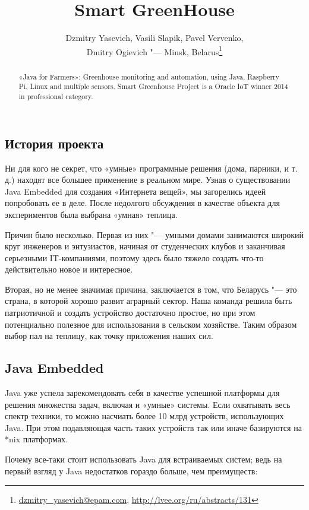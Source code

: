 \documentclass[10pt, a5paper]{article}
\begin{document}
\title{Smart GreenHouse}
\author{Dzmitry Yasevich, Vasili Slapik, Pavel Vervenko, \\
Dmitry Ogievich "--- Minsk, Belarus\footnote{\url{dzmitry_yasevich@epam.com}, \url{http://lvee.org/ru/abstracts/131}}}
\maketitle
\begin{abstract}
«Java for Farmers»: Greenhouse monitoring and automation, using Java, Raspberry Pi, Linux and multiple sensors. Smart Greenhouse Project is a Oracle IoT winner 2014 in professional category.
\end{abstract}
\subsection*{История проекта}

Ни для кого не секрет, что «умные» программные решения (дома, парники, и т.\,д.) находят все большее применение в реальном мире. Узнав о существовании Java Embedded для создания «Интернета вещей», мы загорелись идеей попробовать ее в деле. После недолгого обсуждения в качестве объекта для экспериментов была выбрана «умная» теплица.

Причин было несколько. Первая из них "--- умными домами занимаются широкий круг инженеров и энтузиастов, начиная от студенческих клубов и заканчивая серьезными IT-компаниями, поэтому здесь было тяжело создать что-то действительно новое и интересное.

Вторая, но не менее значимая причина, заключается в том, что Беларусь "--- это страна, в которой хорошо развит аграрный сектор. Наша команда решила быть патриотичной и создать устройство достаточно простое, но при этом потенциально полезное для использования в сельском хозяйстве. Таким образом выбор пал на теплицу, как точку приложения наших сил.

\subsection*{Java Embedded}

Java уже успела зарекомендовать себя в качестве успешной платформы для решения множества задач, включая и «умные» системы. Если охватывать весь спектр техники, то можно насчиать более 10 млрд устройств, использующих Java. При этом подавляющая часть таких устройств так или иначе базируются на *nix платформах.

Почему все-таки стоит использовать Java для встраиваемых систем; ведь на первый взгляд у Java недостатков гораздо больше, чем преимуществ:
\end{document}
